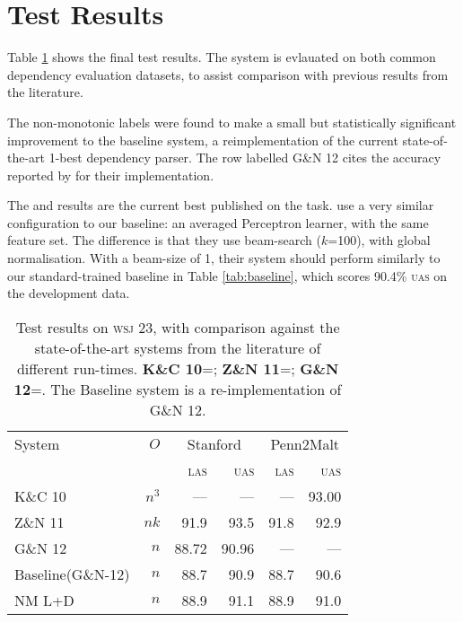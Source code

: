 \documentclass[11pt,letterpaper]{article}
\newcommand{\las}{\textsc{las}\xspace}
\newcommand{\uas}{\textsc{uas}\xspace}
\newcommand{\wsj}{\textsc{wsj}\xspace}
\begin{document}



\section{Test Results}

Table \ref{tab:eval} shows the final test results. The system is evlauated on
both common dependency evaluation datasets, to assist comparison with previous
results from the literature.

The non-monotonic labels were found to make a small but statistically significant
improvement to the baseline system, a reimplementation of the current state-of-the-art
1-best dependency parser. The row labelled G\&N 12 cites the accuracy reported by
\citet{goldberg:12} for their implementation.

The \citet{koo:10} and \citet{zhang:11} results are the current best published
on the task. \citet{zhang:11} use a very similar configuration to our baseline:
an averaged Perceptron learner, with the same feature set. The difference is 
that they use beam-search ($k$=100), with global normalisation. With a beam-size
of 1, their system should perform similarly to our standard-trained baseline in
Table \ref{tab:baseline}, which scores 90.4\% \uas on the development data.

\begin{table}
    \centering
    \small
    \begin{tabular}{l|r|rr|rr}
        \hline 
System  &   $O$ &  \multicolumn{2}{c}{Stanford} & \multicolumn{2}{|c}{Penn2Malt} \\
        &       &  \las  & \uas  & \las & \uas \\
        \hline \hline
K\&C 10  & $n^3$ & ---   & ---   & ---  & 93.00 \\
Z\&N 11  & $nk$  & 91.9  & 93.5  & 91.8 & 92.9 \\
G\&N 12  & $n$   & 88.72 & 90.96 & ---  & --- \\
        \hline
Baseline(G\&N-12)   & $n$ & 88.7 & 90.9 & 88.7  & 90.6 \\
NM L+D      & $n$ & 88.9 & 91.1 & 88.9  & 91.0 \\
\hline
    \end{tabular}
    \caption{\small Test results on \wsj 23, with comparison against the
        state-of-the-art systems from the literature of different run-times.
        \textbf{K\&C 10}=\citet{koo:10}; \textbf{Z\&N 11}=\citet{zhang:11};
        \textbf{G\&N 12}=\citet{goldberg:12}. The Baseline system is a re-implementation
             of G\&N 12.\label{tab:eval}}
\end{table}
\end{document}

